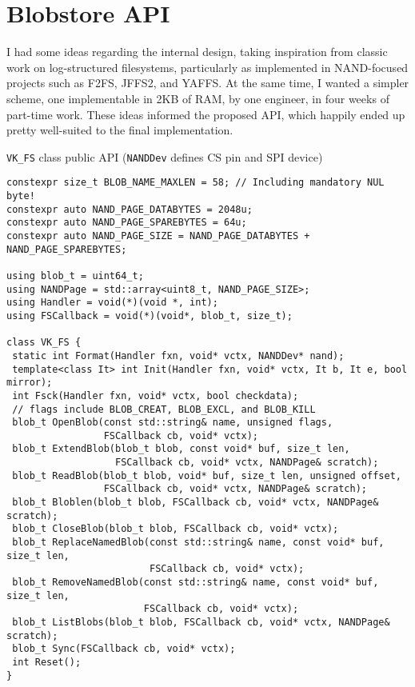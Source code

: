 \documentclass[letterpaper,10pt]{article}
\begin{document}
\section{Blobstore API}
I had some ideas regarding the internal design, taking inspiration from
classic work on log-structured filesystems\parencite{sprite}, particularly
as implemented in NAND-focused projects such as F2FS\parencite{f2fs},
JFFS2\parencite{jffs}, and YAFFS\parencite{yaffs}. At the same time, I wanted
a simpler scheme, one implementable in 2KB of RAM, by one engineer, in four
weeks of part-time work. These ideas informed the proposed API, which happily
ended up pretty well-suited to the final implementation.

\begin{listing}[ht]
\caption{{\texttt{VK\_FS}} class public API ({\texttt{NANDDev}} defines CS pin and SPI device)}
\begin{verbatim}
constexpr size_t BLOB_NAME_MAXLEN = 58; // Including mandatory NUL byte!
constexpr auto NAND_PAGE_DATABYTES = 2048u;
constexpr auto NAND_PAGE_SPAREBYTES = 64u;
constexpr auto NAND_PAGE_SIZE = NAND_PAGE_DATABYTES + NAND_PAGE_SPAREBYTES;

using blob_t = uint64_t;
using NANDPage = std::array<uint8_t, NAND_PAGE_SIZE>;
using Handler = void(*)(void *, int);
using FSCallback = void(*)(void*, blob_t, size_t);

class VK_FS {
 static int Format(Handler fxn, void* vctx, NANDDev* nand);
 template<class It> int Init(Handler fxn, void* vctx, It b, It e, bool mirror);
 int Fsck(Handler fxn, void* vctx, bool checkdata);
 // flags include BLOB_CREAT, BLOB_EXCL, and BLOB_KILL
 blob_t OpenBlob(const std::string& name, unsigned flags,
                 FSCallback cb, void* vctx);
 blob_t ExtendBlob(blob_t blob, const void* buf, size_t len,
                   FSCallback cb, void* vctx, NANDPage& scratch);
 blob_t ReadBlob(blob_t blob, void* buf, size_t len, unsigned offset,
                 FSCallback cb, void* vctx, NANDPage& scratch);
 blob_t Bloblen(blob_t blob, FSCallback cb, void* vctx, NANDPage& scratch);
 blob_t CloseBlob(blob_t blob, FSCallback cb, void* vctx);
 blob_t ReplaceNamedBlob(const std::string& name, const void* buf, size_t len,
                         FSCallback cb, void* vctx);
 blob_t RemoveNamedBlob(const std::string& name, const void* buf, size_t len,
                        FSCallback cb, void* vctx);
 blob_t ListBlobs(blob_t blob, FSCallback cb, void* vctx, NANDPage& scratch);
 blob_t Sync(FSCallback cb, void* vctx);
 int Reset();
}
\end{verbatim}
\end{listing}
\end{document}
